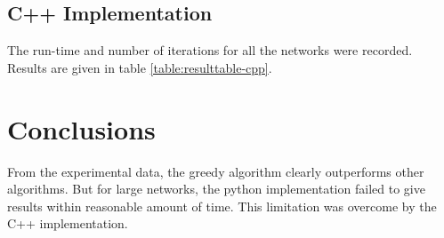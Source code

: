 




\subsection{C++ Implementation}
The run-time and number of iterations for all the networks were
recorded. Results are given in table \ref{table:resulttable-cpp}.




\section{Conclusions}
From the experimental data, the greedy algorithm clearly outperforms
other algorithms.
But for large networks, the python implementation
failed to give results within reasonable amount of time.
This limitation was overcome by the C++ implementation.
